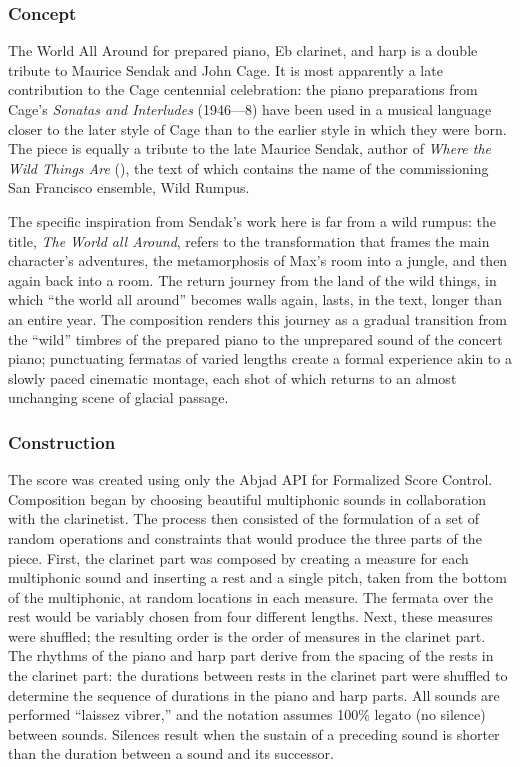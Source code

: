 \subsubsection{Concept}
The World All Around for prepared piano, Eb clarinet, and harp is a double tribute to Maurice Sendak and John Cage. It is most apparently a late contribution to the Cage centennial celebration: the piano preparations from Cage's \emph{Sonatas and Interludes} (1946---8) have been used in a musical language closer to the later style of Cage than to the earlier style in which they were born. The piece is equally a tribute to the late Maurice Sendak, author of \emph{Where the Wild Things Are} (\cite{lystad1989taming}), the text of which contains the name of the commissioning San Francisco ensemble, Wild Rumpus.

The specific inspiration from Sendak's work here is far from a wild rumpus: the title, \emph{The World all Around}, refers to the transformation that frames the main character's adventures, the metamorphosis of Max's room into a jungle, and then again back into a room. The return journey from the land of the wild things, in which ``the world all around'' becomes walls again, lasts, in the text, longer than an entire year. The composition renders this journey as a gradual transition from the ``wild'' timbres of the prepared piano to the unprepared sound of the concert piano; punctuating fermatas of varied lengths create a formal experience akin to a slowly paced cinematic montage, each shot of which returns to an almost unchanging scene of glacial passage. 

\subsubsection{Construction}
The score was created using only the Abjad API for Formalized Score Control. Composition began by choosing beautiful multiphonic sounds in collaboration with the clarinetist. The process then consisted of the formulation of a set of random operations and constraints that would produce the three parts of the piece. First, the clarinet part was composed by creating a measure for each multiphonic sound and inserting a rest and a single pitch, taken from the bottom of the multiphonic, at random locations in each measure. The fermata over the rest would be variably chosen from four different lengths. Next, these measures were shuffled; the resulting order is the order of measures in the clarinet part. The rhythms of the piano and harp part derive from the spacing of the rests in the clarinet part: the durations between rests in the clarinet part were shuffled to determine the sequence of durations in the piano and harp parts. All sounds are performed ``laissez vibrer,'' and the notation assumes 100\% legato (no silence) between sounds. Silences result when the sustain of a preceding sound is shorter than the duration between a sound and its successor. 

